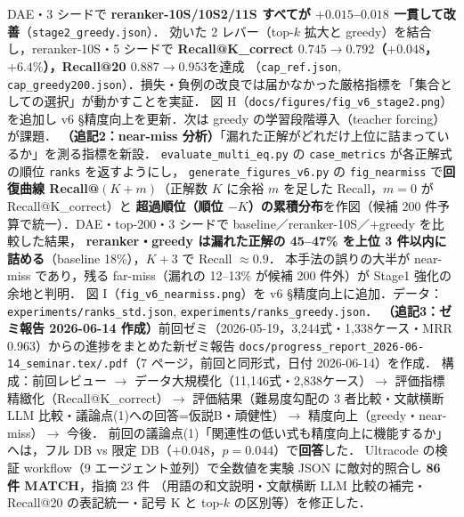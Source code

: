\documentclass[11pt,a4paper]{jsarticle}
\begin{document}
\begin{itemize}[nosep]
    DAE・3 シードで \textbf{reranker-10S/10S2/11S すべてが $+0.015$--$0.018$ 一貫して改善}（\texttt{stage2\_greedy.json}）．
    効いた 2 レバー（top-$k$ 拡大と greedy）を結合し，reranker-10S・5 シードで
    \textbf{Recall@K\_correct $0.745\to0.792$（$+0.048$，$+6.4\%$），Recall@20 $0.887\to0.953$}を達成
    （\texttt{cap\_ref.json}, \texttt{cap\_greedy200.json}）．損失・負例の改良では届かなかった厳格指標を「集合としての選択」が動かすことを実証．
    図 H（\texttt{docs/figures/fig\_v6\_stage2.png}）を追加し v6 §精度向上を更新．次は greedy の学習段階導入（teacher forcing）が課題．
    \textbf{（追記2：near-miss 分析）}「漏れた正解がどれだけ上位に詰まっているか」を測る指標を新設．
    \texttt{evaluate\_multi\_eq.py} の \texttt{case\_metrics} が各正解式の順位 \texttt{ranks} を返すようにし，
    \texttt{generate\_figures\_v6.py} の \texttt{fig\_nearmiss} で\textbf{回復曲線 Recall@$(K+m)$}（正解数 $K$ に余裕 $m$ を足した Recall，$m{=}0$ が Recall@K\_correct）と
    \textbf{超過順位（順位 $-K$）の累積分布}を作図（候補 200 件予算で統一）．DAE・top-200・3 シードで baseline／reranker-10S／+greedy を比較した結果，
    \textbf{reranker・greedy は漏れた正解の 45--47\% を上位 3 件以内に詰める}（baseline 18\%），$K+3$ で Recall $\approx 0.9$．
    本手法の誤りの大半が near-miss であり，残る far-miss（漏れの 12--13\% が候補 200 件外）が Stage1 強化の余地と判明．
    図 I（\texttt{fig\_v6\_nearmiss.png}）を v6 §精度向上に追加．データ：\texttt{experiments/ranks\_std.json}, \texttt{experiments/ranks\_greedy.json}．
    \textbf{（追記3：ゼミ報告 2026-06-14 作成）}前回ゼミ（2026-05-19，3{,}244式・1{,}338ケース・MRR 0.963）からの進捗をまとめた新ゼミ報告
    \texttt{docs/progress\_report\_2026-06-14\_seminar.tex/.pdf}（7 ページ，前回と同形式，日付 2026-06-14）を作成．
    構成：前回レビュー $\to$ データ大規模化（11{,}146式・2{,}838ケース）$\to$ 評価指標精緻化（Recall@K\_correct）$\to$
    評価結果（難易度勾配の 3 者比較・文献横断 LLM 比較・議論点(1)への回答=仮説B・頑健性）$\to$ 精度向上（greedy・near-miss）$\to$ 今後．
    前回の議論点(1)「関連性の低い式も精度向上に機能するか」へは，フル DB vs 限定 DB（$+0.048$，$p=0.044$）で\textbf{回答}した．
    Ultracode の検証 workflow（9 エージェント並列）で全数値を実験 JSON に敵対的照合し \textbf{86 件 MATCH}，指摘 23 件
    （用語の和文説明・文献横断 LLM 比較の補完・Recall@20 の表記統一・記号 K と top-$k$ の区別等）を修正した．


\end{itemize}
\end{document}
